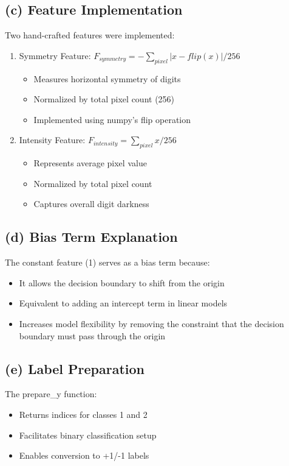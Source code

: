 \documentclass{article}
\begin{document}
\subsection*{(c) Feature Implementation}
Two hand-crafted features were implemented:
\begin{enumerate}
    \item Symmetry Feature: $F_{symmetry} = -\sum_{pixel}|x - flip(x)|/256$
    \begin{itemize}
        \item Measures horizontal symmetry of digits
        \item Normalized by total pixel count (256)
        \item Implemented using numpy's flip operation
    \end{itemize}

    \item Intensity Feature: $F_{intensity} = \sum_{pixel}x/256$
    \begin{itemize}
        \item Represents average pixel value
        \item Normalized by total pixel count
        \item Captures overall digit darkness
    \end{itemize}
\end{enumerate}

\subsection*{(d) Bias Term Explanation}
The constant feature (1) serves as a bias term because:
\begin{itemize}
    \item It allows the decision boundary to shift from the origin
    \item Equivalent to adding an intercept term in linear models
    \item Increases model flexibility by removing the constraint that the decision boundary must pass through the origin
\end{itemize}

\subsection*{(e) Label Preparation}
The prepare\_y function:
\begin{itemize}
    \item Returns indices for classes 1 and 2
    \item Facilitates binary classification setup
    \item Enables conversion to +1/-1 labels
\end{itemize}
\end{document}
